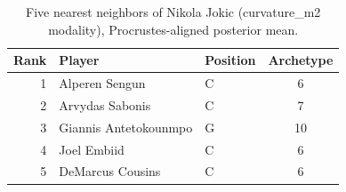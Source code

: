 \begin{table}[htbp]
  \centering\small
  \begin{tabular}{rllc}
    \toprule
    Rank & Player & Position & Archetype \\
    \midrule
    1 & Alperen Sengun & C & 6 \\
    2 & Arvydas Sabonis & C & 7 \\
    3 & Giannis Antetokounmpo & G & 10 \\
    4 & Joel Embiid & C & 6 \\
    5 & DeMarcus Cousins & C & 6 \\
    \bottomrule
  \end{tabular}
  \caption{Five nearest neighbors of Nikola Jokic (curvature_m2 modality), Procrustes-aligned posterior mean.}
  \label{tab:Nikola_Jokic_neighbors_curvature_m2}
\end{table}

